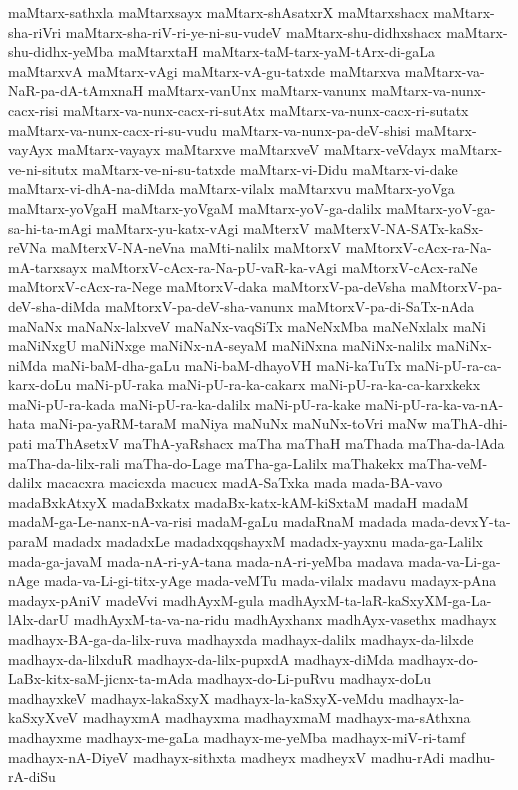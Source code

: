 {maMtarx-sathxla
maMtarxsayx
maMtarx-shAsatxrX
maMtarxshacx
maMtarx-sha-riVri
maMtarx-sha-riV-ri-ye-ni-su-vudeV
maMtarx-shu-didhxshacx
maMtarx-shu-didhx-yeMba
maMtarxtaH
maMtarx-taM-tarx-yaM-tArx-di-gaLa
maMtarxvA
maMtarx-vAgi
maMtarx-vA-gu-tatxde
maMtarxva
maMtarx-va-NaR-pa-dA-tAmxnaH
maMtarx-vanUnx
maMtarx-vanunx
maMtarx-va-nunx-cacx-risi
maMtarx-va-nunx-cacx-ri-sutAtx
maMtarx-va-nunx-cacx-ri-sutatx
maMtarx-va-nunx-cacx-ri-su-vudu
maMtarx-va-nunx-pa-deV-shisi
maMtarx-vayAyx
maMtarx-vayayx
maMtarxve
maMtarxveV
maMtarx-veVdayx
maMtarx-ve-ni-situtx
maMtarx-ve-ni-su-tatxde
maMtarx-vi-Didu
maMtarx-vi-dake
maMtarx-vi-dhA-na-diMda
maMtarx-vilalx
maMtarxvu
maMtarx-yoVga
maMtarx-yoVgaH
maMtarx-yoVgaM
maMtarx-yoV-ga-dalilx
maMtarx-yoV-ga-sa-hi-ta-mAgi
maMtarx-yu-katx-vAgi
maMterxV
maMterxV-NA-SATx-kaSx-reVNa
maMterxV-NA-neVna
maMti-nalilx
maMtorxV
maMtorxV-cAcx-ra-Na-mA-tarxsayx
maMtorxV-cAcx-ra-Na-pU-vaR-ka-vAgi
maMtorxV-cAcx-raNe
maMtorxV-cAcx-ra-Nege
maMtorxV-daka
maMtorxV-pa-deVsha
maMtorxV-pa-deV-sha-diMda
maMtorxV-pa-deV-sha-vanunx
maMtorxV-pa-di-SaTx-nAda
maNaNx
maNaNx-lalxveV
maNaNx-vaqSiTx
maNeNxMba
maNeNxlalx
maNi
maNiNxgU
maNiNxge
maNiNx-nA-seyaM
maNiNxna
maNiNx-nalilx
maNiNx-niMda
maNi-baM-dha-gaLu
maNi-baM-dhayoVH
maNi-kaTuTx
maNi-pU-ra-ca-karx-doLu
maNi-pU-raka
maNi-pU-ra-ka-cakarx
maNi-pU-ra-ka-ca-karxkekx
maNi-pU-ra-kada
maNi-pU-ra-ka-dalilx
maNi-pU-ra-kake
maNi-pU-ra-ka-va-nA-hata
maNi-pa-yaRM-taraM
maNiya
maNuNx
maNuNx-toVri
maNw
maThA-dhi-pati
maThAsetxV
maThA-yaRshacx
maTha
maThaH
maThada
maTha-da-lAda
maTha-da-lilx-rali
maTha-do-Lage
maTha-ga-Lalilx
maThakekx
maTha-veM-dalilx
macacxra
macicxda
macucx
madA-SaTxka
mada
mada-BA-vavo
madaBxkAtxyX
madaBxkatx
madaBx-katx-kAM-kiSxtaM
madaH
madaM
madaM-ga-Le-nanx-nA-va-risi
madaM-gaLu
madaRnaM
madada
mada-devxY-ta-paraM
madadx
madadxLe
madadxqqshayxM
madadx-yayxnu
mada-ga-Lalilx
mada-ga-javaM
mada-nA-ri-yA-tana
mada-nA-ri-yeMba
madava
mada-va-Li-ga-nAge
mada-va-Li-gi-titx-yAge
mada-veMTu
mada-vilalx
madavu
madayx-pAna
madayx-pAniV
madeVvi
madhAyxM-gula
madhAyxM-ta-laR-kaSxyXM-ga-La-lAlx-darU
madhAyxM-ta-va-na-ridu
madhAyxhanx
madhAyx-vasethx
madhayx
madhayx-BA-ga-da-lilx-ruva
madhayxda
madhayx-dalilx
madhayx-da-lilxde
madhayx-da-lilxduR
madhayx-da-lilx-pupxdA
madhayx-diMda
madhayx-do-LaBx-kitx-saM-jicnx-ta-mAda
madhayx-do-Li-puRvu
madhayx-doLu
madhayxkeV
madhayx-lakaSxyX
madhayx-la-kaSxyX-veMdu
madhayx-la-kaSxyXveV
madhayxmA
madhayxma
madhayxmaM
madhayx-ma-sAthxna
madhayxme
madhayx-me-gaLa
madhayx-me-yeMba
madhayx-miV-ri-tamf
madhayx-nA-DiyeV
madhayx-sithxta
madheyx
madheyxV
madhu-rAdi
madhu-rA-diSu
}
